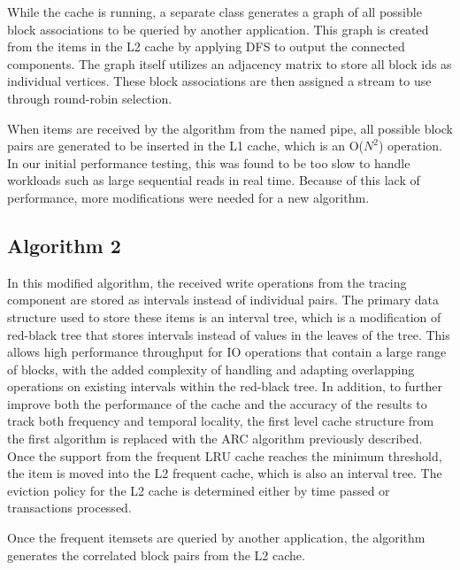 \documentclass[MEng]{uofl}
\begin{document}
While the cache is running, a separate class generates a graph of all possible block associations to be queried by another application. This graph is created from the items in the L2 cache by applying DFS to output the connected components. The graph itself utilizes an adjacency matrix to store all block ids as individual vertices. These block associations are then assigned a stream to use through round-robin selection. 

When items are received by the algorithm from the named pipe, all possible block pairs are generated to be inserted in the L1 cache, which is an O($N^2$) operation. In our initial performance testing, this was found to be too slow to handle workloads such as large sequential reads in real time. Because of this lack of performance, more modifications were needed for a new algorithm.

\subsection{Algorithm 2}
In this modified algorithm, the received write operations from the tracing component are stored as intervals instead of individual pairs. The primary data structure used to store these items is an interval tree, which is a modification of red-black tree that stores intervals instead of values in the leaves of the tree. This allows high performance throughput for IO operations that contain a large range of blocks, with the added complexity of handling and adapting overlapping operations on existing intervals within the red-black tree. In addition, to further improve both the performance of the cache and the accuracy of the results to track both frequency and temporal locality, the first level cache structure from the first algorithm is replaced with the ARC algorithm previously described. Once the support from the frequent LRU cache reaches the minimum threshold, the item is moved into the L2 frequent cache, which is also an interval tree. The eviction policy for the L2 cache is determined either by time passed or transactions processed.

Once the frequent itemsets are queried by another application, the algorithm generates the correlated block pairs from the L2 cache. 
\end{document}
